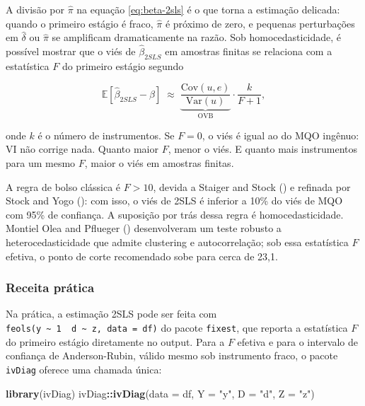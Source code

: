 \documentclass[
]{article}
\newenvironment{Shaded}{\begin{snugshade}}{\end{snugshade}}
\newcommand{\AttributeTok}[1]{\textcolor[rgb]{0.13,0.29,0.53}{#1}}
\newcommand{\FunctionTok}[1]{\textcolor[rgb]{0.13,0.29,0.53}{\textbf{#1}}}
\newcommand{\NormalTok}[1]{#1}
\newcommand{\SpecialCharTok}[1]{\textcolor[rgb]{0.81,0.36,0.00}{\textbf{#1}}}
\newcommand{\StringTok}[1]{\textcolor[rgb]{0.31,0.60,0.02}{#1}}
\begin{document}
A divisão por \(\hat\pi\) na equação \eqref{eq:beta-2sls} é o que torna a estimação delicada: quando o primeiro estágio é fraco, \(\hat\pi\) é próximo de zero, e pequenas perturbações em \(\hat\delta\) ou \(\hat\pi\) se amplificam dramaticamente na razão. Sob homocedasticidade, é possível mostrar que o viés de \(\hat\beta_{2SLS}\) em amostras finitas se relaciona com a estatística \(F\) do primeiro estágio segundo

\begin{equation}
\mathbb{E}[\hat\beta_{2SLS} - \beta] \;\approx\; \underbrace{\frac{\text{Cov}(u, e)}{\text{Var}(u)}}_{\text{OVB}} \cdot \frac{k}{F + 1},
\label{eq:vies-2sls}
\end{equation}

onde \(k\) é o número de instrumentos. Se \(F = 0\), o viés é igual ao do MQO ingênuo: VI não corrige nada. Quanto maior \(F\), menor o viés. E quanto mais instrumentos para um mesmo \(F\), maior o viés em amostras finitas.

A regra de bolso clássica é \(F > 10\), devida a Staiger and Stock () e refinada por Stock and Yogo (): com isso, o viés de 2SLS é inferior a 10\% do viés de MQO com 95\% de confiança. A suposição por trás dessa regra é homocedasticidade. Montiel Olea and Pflueger () desenvolveram um teste robusto a heterocedasticidade que admite clustering e autocorrelação; sob essa estatística \(F\) efetiva, o ponto de corte recomendado sobe para cerca de 23,1.

\subsubsection{Receita prática}\label{receita-pruxe1tica}

Na prática, a estimação 2SLS pode ser feita com \texttt{feols(y\ \textasciitilde{}\ 1\ \textbar{}\ d\ \textasciitilde{}\ z,\ data\ =\ df)} do pacote \texttt{fixest}, que reporta a estatística \(F\) do primeiro estágio diretamente no output. Para a \(F\) efetiva e para o intervalo de confiança de Anderson-Rubin, válido mesmo sob instrumento fraco, o pacote \texttt{ivDiag} oferece uma chamada única:

\begin{Shaded}
\begin{Highlighting}[]
\FunctionTok{library}\NormalTok{(ivDiag)}
\NormalTok{ivDiag}\SpecialCharTok{::}\FunctionTok{ivDiag}\NormalTok{(}\AttributeTok{data =}\NormalTok{ df, }\AttributeTok{Y =} \StringTok{"y"}\NormalTok{, }\AttributeTok{D =} \StringTok{"d"}\NormalTok{, }\AttributeTok{Z =} \StringTok{"z"}\NormalTok{)}
\end{Highlighting}
\end{Shaded}
\end{document}
